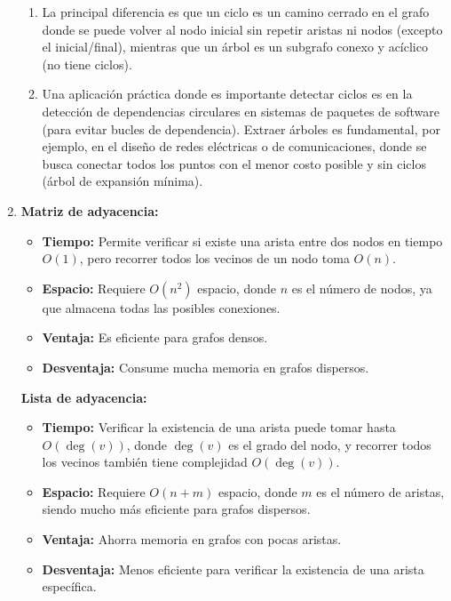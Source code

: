 \documentclass[12pt]{article}
\begin{document}
\begin{enumerate}
\begin{enumerate}[label=\alph*)]
                \item La principal diferencia es que un ciclo es un camino cerrado en el grafo donde se puede volver al nodo inicial sin repetir aristas ni nodos (excepto el inicial/final), mientras que un árbol es un subgrafo conexo y acíclico (no tiene ciclos).

                \item Una aplicación práctica donde es importante detectar ciclos es en la detección de dependencias circulares en sistemas de paquetes de software (para evitar bucles de dependencia). Extraer árboles es fundamental, por ejemplo, en el diseño de redes eléctricas o de comunicaciones, donde se busca conectar todos los puntos con el menor costo posible y sin ciclos (árbol de expansión mínima).
            \end{enumerate}

            \item 
            \textbf{Matriz de adyacencia:}
            \begin{itemize}
                \item \textbf{Tiempo:} Permite verificar si existe una arista entre dos nodos en tiempo $O(1)$, pero recorrer todos los vecinos de un nodo toma $O(n)$.
                \item \textbf{Espacio:} Requiere $O(n^2)$ espacio, donde $n$ es el número de nodos, ya que almacena todas las posibles conexiones.
                \item \textbf{Ventaja:} Es eficiente para grafos densos.
                \item \textbf{Desventaja:} Consume mucha memoria en grafos dispersos.
            \end{itemize}

            \textbf{Lista de adyacencia:}
            \begin{itemize}
                \item \textbf{Tiempo:} Verificar la existencia de una arista puede tomar hasta $O(\deg(v))$, donde $\deg(v)$ es el grado del nodo, y recorrer todos los vecinos también tiene complejidad $O(\deg(v))$.
                \item \textbf{Espacio:} Requiere $O(n + m)$ espacio, donde $m$ es el número de aristas, siendo mucho más eficiente para grafos dispersos.
                \item \textbf{Ventaja:} Ahorra memoria en grafos con pocas aristas.
                \item \textbf{Desventaja:} Menos eficiente para verificar la existencia de una arista específica.
            \end{itemize}


\end{enumerate}
\end{document}
